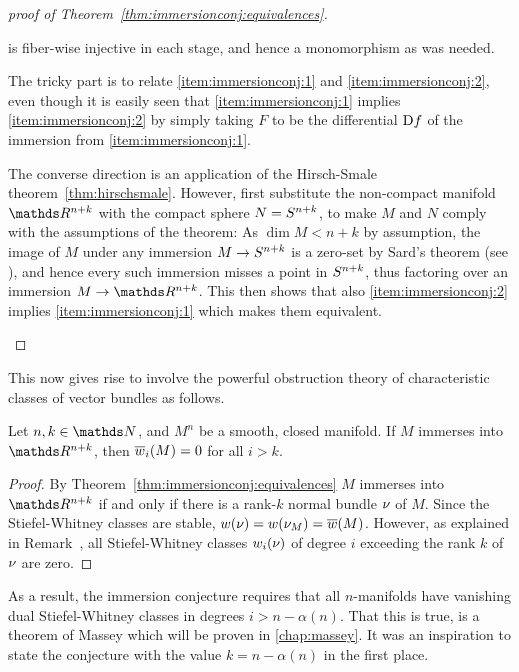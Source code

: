 \begin{proof}[proof of Theorem~\ref{thm:immersionconj:equivalences}]
\begin{description}
\begin{center}
    \end{center}
    is fiber-wise injective in each stage, and hence a monomorphism as
    was needed.
  \item[\ref{item:immersionconj:1}$\Leftrightarrow$\ref{item:immersionconj:2}:]
    The tricky part is to relate \ref{item:immersionconj:1} and
    \ref{item:immersionconj:2}, even though it is easily seen that
    \ref{item:immersionconj:1} implies \ref{item:immersionconj:2} by
    simply taking $F$ to be the differential $\mathrm{D} f$ of the
    immersion from \ref{item:immersionconj:1}.
    
    The converse direction is an application of the Hirsch-Smale
    theorem~\ref{thm:hirschsmale}.
    However, first substitute the non-compact manifold $\R^{n+k}$ with
    the compact sphere $N=S^{n+k}$, to make $M$ and $N$ comply
    with the assumptions of the theorem:
    As $\dim M<n+k$ by assumption,
    the image of $M$ under any immersion $M\to S^{n+k}$ is a
    zero-set by Sard's theorem (see \forexample \cite[Chap.~3,
    Theorem~1.3]{hirsch}), and hence every such immersion misses a
    point in $S^{n+k}$, thus factoring over an immersion
    $M\to\R^{n+k}$.
    This then shows that also \ref{item:immersionconj:2} implies
    \ref{item:immersionconj:1} which makes them equivalent.
    \qedhere
  \end{description}
\end{proof}

This now gives rise to involve the powerful obstruction theory of
characteristic classes of vector bundles as follows.
\begin{Cor}\label{cor:obstruction}
  Let $n,k\in\Nat$, and $M^n$ be a smooth, closed manifold.
  If $M$ immerses into $\R^{n+k}$, then ${\overline{w}_{i}}(M)=0$ for all
  $i>k$.
  \begin{proof}
    By Theorem~\ref{thm:immersionconj:equivalences} $M$ immerses
    into $\R^{n+k}$ if and only if there is a rank-$k$
    normal bundle $\nu_{}$ of $M$.
    Since the Stiefel-Whitney classes are stable,
    ${w}(\nu_{})={w}(\nu_{M})={\overline{w}}(M)$.
    However, as explained in
    Remark~,
    all Stiefel-Whitney classes ${w_{i}}(\nu_{})$ of degree $i$ exceeding
    the rank $k$ of $\nu_{}$ are zero.
  \end{proof}
\end{Cor}
As a result, the immersion conjecture requires that all $n$-manifolds
have vanishing dual Stiefel-Whitney classes in degrees $i>n-\alpha(n)$.
That this is true, is a theorem of Massey which will be proven in
\autoref{chap:massey}. It was an inspiration to state the conjecture
with the value $k=n-\alpha(n)$ in the first place.


